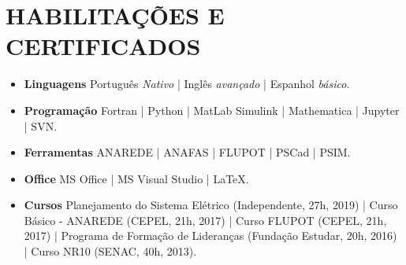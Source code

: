 \documentclass[11pt,a4paper,sans]{moderncv}
\begin{document}
\section{HABILITAÇÕES E CERTIFICADOS}
\begin{itemize}
	
	\item \textbf{Linguagens} Português \textit{Nativo} | Inglês \textit{avançado} | Espanhol \textit{básico}.\vspace{-0.15cm}
	
	\item \textbf{Programação} Fortran | Python | MatLab Simulink | Mathematica | Jupyter | SVN.\vspace{-0.15cm}
	
	\item \textbf{Ferramentas} ANAREDE | ANAFAS | FLUPOT | PSCad | PSIM.\vspace{-0.15cm}
	
	\item \textbf{Office} MS Office | MS Visual Studio | \LaTeX. \vspace{-0.15cm} 
	
	\item \textbf{Cursos} Planejamento do Sistema Elétrico (Independente, 27h, 2019) | Curso Básico - ANAREDE (CEPEL, 21h, 2017) | Curso FLUPOT (CEPEL, 21h, 2017) | Programa de Formação de Lideranças (Fundação Estudar, 20h, 2016) | Curso NR10 (SENAC, 40h, 2013).
	
\end{itemize}
\end{document}
